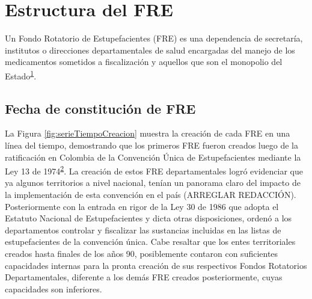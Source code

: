 \documentclass[
]{book}
\begin{document}
\hypertarget{estructura-del-fre}{%
\chapter{Estructura del FRE}\label{estructura-del-fre}}


Un Fondo Rotatorio de Estupefacientes (FRE) es una dependencia de secretaría, institutos o direcciones departamentales de salud encargadas del manejo de los medicamentos sometidos a fiscalización y aquellos que son el monopolio del Estado\textsuperscript{\protect\hyperlink{ref-MSPS1479-2006}{1}}.

\hypertarget{fecha-de-constituciuxf3n-de-fre}{%
\section{Fecha de constitución de FRE}\label{fecha-de-constituciuxf3n-de-fre}}

La Figura \ref{fig:serieTiempoCreacion} muestra la creación de cada FRE en una línea del tiempo, demostrando que los primeros FRE fueron creados luego de la ratificación en Colombia de la Convención Única de Estupefacientes mediante la Ley 13 de 1974\textsuperscript{\protect\hyperlink{ref-CongresodelaRepublica1974}{2}}. La creación de estos FRE departamentales logró evidenciar que ya algunos territorios a nivel nacional, tenían un panorama claro del impacto de la implementación de esta convención en el país (ARREGLAR REDACCIÓN). Posteriormente con la entrada en rigor de la Ley 30 de 1986 que adopta el Estatuto Nacional de Estupefacientes y dicta otras disposiciones, ordenó a los departamentos controlar y fiscalizar las sustancias incluidas en las listas de estupefacientes de la convención única. Cabe resaltar que los entes territoriales creados hasta finales de los años 90, posiblemente contaron con suficientes capacidades internas para la pronta creación de sus respectivos Fondos Rotatorios Departamentales, diferente a los demás FRE creados posteriormente, cuyas capacidades son inferiores.
\end{document}
